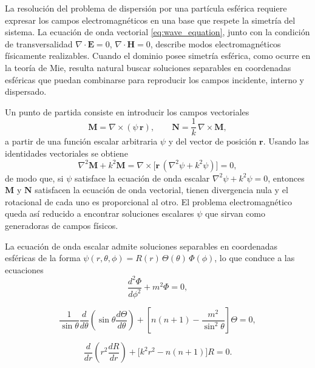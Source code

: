 La resolución del problema de dispersión por una partícula esférica requiere
expresar los campos electromagnéticos en una base que respete la simetría del
sistema. La ecuación de onda vectorial \eqref{eq:wave_equation},
junto con la condición de transversalidad $\nabla \cdot \mathbf{E} = 0$,
$\nabla \cdot \mathbf{H} = 0$, describe modos electromagnéticos físicamente
realizables. Cuando el dominio posee simetría esférica, como ocurre en la
teoría de Mie, resulta natural buscar soluciones separables en coordenadas
esféricas que puedan combinarse para reproducir los campos incidente, interno y
dispersado.

Un punto de partida consiste en introducir los campos 
vectoriales \cite[cap.~4]{Bohren1983}\cite[cap.~7]{Stratton1941}
\[
  \mathbf{M} = \nabla \times (\psi\,\mathbf{r}),
  \qquad
  \mathbf{N} = \frac{1}{k}\,\nabla \times \mathbf{M},
\]
a partir de una función escalar arbitraria $\psi$ y del vector de posición
$\mathbf{r}$. Usando las identidades vectoriales se obtiene
\[
  \nabla^2 \mathbf{M} + k^2 \mathbf{M}
  = \nabla \times \bigl[\mathbf{r}\,(\nabla^2\psi + k^2\psi)\bigr] = 0,
\]
de modo que, si $\psi$ satisface la ecuación de onda escalar
$\nabla^2\psi + k^2\psi = 0$, entonces $\mathbf{M}$ y $\mathbf{N}$ satisfacen
la ecuación de onda vectorial, tienen divergencia nula y el rotacional de cada
uno es proporcional al otro. El problema electromagnético queda así reducido a
encontrar soluciones escalares $\psi$ que sirvan como generadoras de campos
físicos.

La ecuación de onda escalar admite soluciones separables en coordenadas
esféricas de la forma $\psi(r,\theta,\phi) = R(r)\,\Theta(\theta)\,\Phi(\phi)$,
lo que conduce a las ecuaciones
\begin{equation}
  \frac{d^{2}\Phi}{d\phi^{2}} + m^{2}\Phi = 0,
\end{equation}

\begin{equation}
  \frac{1}{\sin\theta}\frac{d}{d\theta}\!\left(\sin\theta\frac{d\Theta}{d\theta}\right)
  + \left[n(n+1) - \frac{m^{2}}{\sin^{2}\theta}\right]\Theta = 0,
\end{equation}

\begin{equation}
  \frac{d}{dr}\!\left(r^{2}\frac{dR}{dr}\right)
  + \bigl[k^{2}r^{2} - n(n+1)\bigr]R = 0.
\end{equation}


